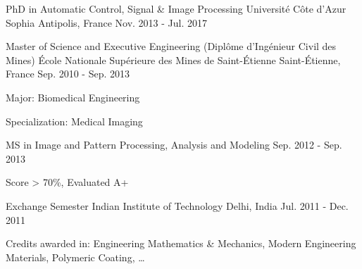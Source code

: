 
\begin{cventries}

  \cventry
    {\faGraduationCap\acvHeaderIconSep PhD in Automatic Control, Signal \& Image Processing} %
    {Université Côte d'Azur} %
    {Sophia Antipolis, France} %
    {Nov. 2013 - Jul. 2017} %
    {
	}

 
  \cventry
    {\faGraduationCap\acvHeaderIconSep Master of Science and Executive Engineering (Diplôme d'Ingénieur Civil des Mines)} %
    {École Nationale Supérieure des Mines de Saint-Étienne} %
    {Saint-Étienne, France} %
    {Sep. 2010 - Sep. 2013} %
    {
      \begin{cvitems} %
        \item {Major: Biomedical Engineering}
        \item {Specialization: Medical Imaging}
      \end{cvitems}
    }
  
  \cventry
    {\faGraduationCap\acvHeaderIconSep MS in Image and Pattern Processing, Analysis and Modeling}
    {} %
    {} %
    {Sep. 2012 - Sep. 2013} %
    {
      \begin{cvitems} %
        \item {Score > 70\%, Evaluated A+}
      \end{cvitems}
    }
    
  \cventry
    {Exchange Semester} %
    {Indian Institute of Technology} %
    {Delhi, India} %
    {Jul. 2011 - Dec. 2011} %
    {
      \begin{cvitems} %
        \item {Credits awarded in: Engineering Mathematics \& Mechanics, Modern Engineering Materials, Polymeric Coating, \ldots}
      \end{cvitems}
    }
    

\end{cventries}
